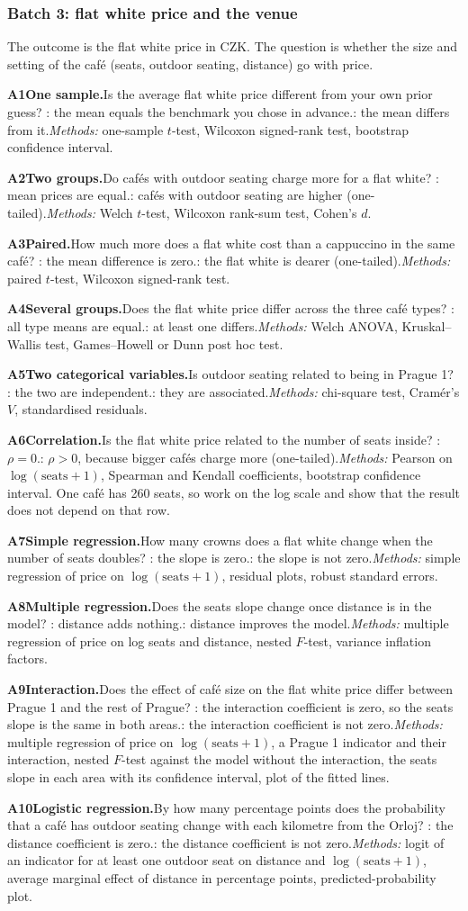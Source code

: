 \documentclass[11pt,a4paper]{article}
\newcommand{\analysis}[6]{%
  \par\smallskip\noindent\textbf{A#1\enspace #2.}\enspace #3\enspace
  \Ho: #4\enspace \Hone: #5\enspace \textit{Methods:} #6\par}
\begin{document}
\clearpage
\subsubsection{Batch 3: flat white price and the venue}

The outcome is the flat white price in CZK. The question is whether the size and setting of the caf\'e (seats, outdoor seating, distance) go with price.

\analysis{1}{One sample}{Is the average flat white price different from your own prior guess?}{the mean equals the benchmark you chose in advance.}{the mean differs from it.}{one-sample $t$-test, Wilcoxon signed-rank test, bootstrap confidence interval.}
\analysis{2}{Two groups}{Do caf\'es with outdoor seating charge more for a flat white?}{mean prices are equal.}{caf\'es with outdoor seating are higher (one-tailed).}{Welch $t$-test, Wilcoxon rank-sum test, Cohen's $d$.}
\analysis{3}{Paired}{How much more does a flat white cost than a cappuccino in the same caf\'e?}{the mean difference is zero.}{the flat white is dearer (one-tailed).}{paired $t$-test, Wilcoxon signed-rank test.}
\analysis{4}{Several groups}{Does the flat white price differ across the three caf\'e types?}{all type means are equal.}{at least one differs.}{Welch ANOVA, Kruskal--Wallis test, Games--Howell or Dunn post hoc test.}
\analysis{5}{Two categorical variables}{Is outdoor seating related to being in Prague 1?}{the two are independent.}{they are associated.}{chi-square test, Cram\'er's $V$, standardised residuals.}
\analysis{6}{Correlation}{Is the flat white price related to the number of seats inside?}{$\rho=0$.}{$\rho>0$, because bigger caf\'es charge more (one-tailed).}{Pearson on $\log(\text{seats}+1)$, Spearman and Kendall coefficients, bootstrap confidence interval. One caf\'e has 260 seats, so work on the log scale and show that the result does not depend on that row.}
\analysis{7}{Simple regression}{How many crowns does a flat white change when the number of seats doubles?}{the slope is zero.}{the slope is not zero.}{simple regression of price on $\log(\text{seats}+1)$, residual plots, robust standard errors.}
\analysis{8}{Multiple regression}{Does the seats slope change once distance is in the model?}{distance adds nothing.}{distance improves the model.}{multiple regression of price on log seats and distance, nested $F$-test, variance inflation factors.}
\analysis{9}{Interaction}{Does the effect of caf\'e size on the flat white price differ between Prague 1 and the rest of Prague?}{the interaction coefficient is zero, so the seats slope is the same in both areas.}{the interaction coefficient is not zero.}{multiple regression of price on $\log(\text{seats}+1)$, a Prague 1 indicator and their interaction, nested $F$-test against the model without the interaction, the seats slope in each area with its confidence interval, plot of the fitted lines.}
\analysis{10}{Logistic regression}{By how many percentage points does the probability that a caf\'e has outdoor seating change with each kilometre from the Orloj?}{the distance coefficient is zero.}{the distance coefficient is not zero.}{logit of an indicator for at least one outdoor seat on distance and $\log(\text{seats}+1)$, average marginal effect of distance in percentage points, predicted-probability plot.}
\end{document}
